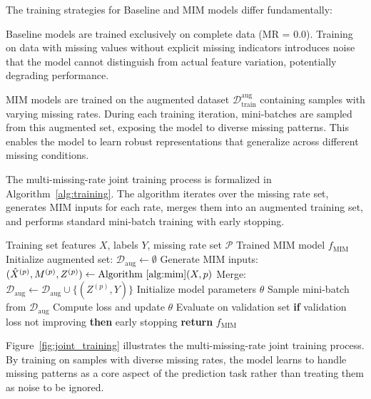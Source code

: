 \documentclass[5p,times]{elsarticle}
\begin{document}
The training strategies for Baseline and MIM models differ fundamentally:

Baseline models are trained exclusively on complete data (MR = 0.0). Training on data with missing values without explicit missing indicators introduces noise that the model cannot distinguish from actual feature variation, potentially degrading performance.

MIM models are trained on the augmented dataset $\mathcal{D}_{\text{train}}^{\text{aug}}$ containing samples with varying missing rates. During each training iteration, mini-batches are sampled from this augmented set, exposing the model to diverse missing patterns. This enables the model to learn robust representations that generalize across different missing conditions.

The multi-missing-rate joint training process is formalized in Algorithm~\ref{alg:training}. The algorithm iterates over the missing rate set, generates MIM inputs for each rate, merges them into an augmented training set, and performs standard mini-batch training with early stopping.

\begin{algorithm}[!htb]
\caption{Multi-Missing-Rate Joint Training}
\label{alg:training}
\begin{algorithmic}[1]
\REQUIRE Training set features $X$, labels $Y$, missing rate set $\mathcal{P}$
\ENSURE Trained MIM model $f_{\text{MIM}}$
\STATE Initialize augmented set: $\mathcal{D}_{\text{aug}} \leftarrow \emptyset$
    \STATE Generate MIM inputs: $(\hat{X}^{(p)}, M^{(p)}, Z^{(p)}) \leftarrow \text{Algorithm~\ref{alg:mim}}(X, p)$
    \STATE Merge: $\mathcal{D}_{\text{aug}} \leftarrow \mathcal{D}_{\text{aug}} \cup \{(Z^{(p)}, Y)\}$
\ENDFOR
\STATE Initialize model parameters $\theta$
    \STATE Sample mini-batch from $\mathcal{D}_{\text{aug}}$
    \STATE Compute loss and update $\theta$
    \STATE Evaluate on validation set
    \STATE \textbf{if} validation loss not improving \textbf{then} early stopping
\ENDFOR
\STATE \textbf{return} $f_{\text{MIM}}$
\end{algorithmic}
\end{algorithm}

Figure~\ref{fig:joint_training} illustrates the multi-missing-rate joint training process. By training on samples with diverse missing rates, the model learns to handle missing patterns as a core aspect of the prediction task rather than treating them as noise to be ignored.
\end{document}

